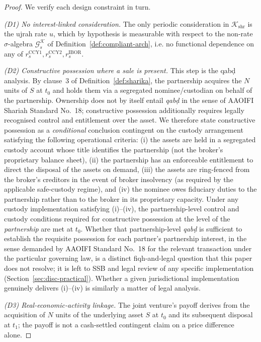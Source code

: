 \documentclass[preprint,12pt,authoryear]{elsarticle}
\theoremstyle{definition}
\begin{document}
\begin{proof}
We verify each design constraint in turn.

\emph{(D1) No interest-linked consideration.} The only periodic
consideration in $\mathcal{K}_{\text{shr}}$ is the ujrah rate
$u$, which by hypothesis is measurable with respect to the
non-rate $\sigma$-algebra $\mathcal{G}^{\mathcal{K}}_{s}$ of
Definition~\ref{def:compliant-arch}, i.e. no functional
dependence on any of $r^{\text{CCY1}}_s, r^{\text{CCY2}}_s,
r^{\text{IBOR}}_s$.

\emph{(D2) Constructive possession where a sale is present.}
This step is the qab\d{d} analysis. By clause~3 of
Definition~\ref{def:sharika}, the partnership acquires the $N$
units of $S$ at $t_0$ and holds them via a segregated
nominee/custodian on behalf of the partnership. Ownership does
not by itself entail \emph{qab\d{d}} in the sense of AAOIFI
Shariah Standard No.~18; constructive possession additionally
requires legally recognised control and entitlement over the
asset. We therefore state constructive possession as a
\emph{conditional} conclusion contingent on the custody
arrangement satisfying the following operational criteria: (i)
the assets are held in a segregated custody account whose title
identifies the partnership (not the broker's proprietary
balance sheet), (ii) the partnership has an enforceable
entitlement to direct the disposal of the assets on demand,
(iii) the assets are ring-fenced from the broker's creditors in
the event of broker insolvency (as required by the applicable
safe-custody regime), and (iv) the nominee owes fiduciary
duties to the partnership rather than to the broker in its
proprietary capacity. Under any custody implementation
satisfying (i)--(iv), the partnership-level control and custody
conditions required for constructive possession at the level of
the \emph{partnership} are met at $t_0$. Whether that
partnership-level \emph{qab\d{d}} is sufficient to establish the
requisite possession for each partner's partnership interest, in
the sense demanded by AAOIFI Standard No.~18 for the relevant
transaction under the particular governing law, is a distinct
fiqh-and-legal question that this paper does not resolve; it is
left to SSB and legal review of any specific implementation
(Section~\ref{sec:disc-practical}). Whether a given
jurisdictional implementation genuinely delivers (i)--(iv) is
similarly a matter of legal analysis.

\emph{(D3) Real-economic-activity linkage.} The joint venture's
payoff derives from the acquisition of $N$ units of the
underlying asset $S$ at $t_0$ and its subsequent disposal at
$t_1$; the payoff is not a cash-settled contingent claim on a
price difference alone.


\end{proof}
\end{document}
